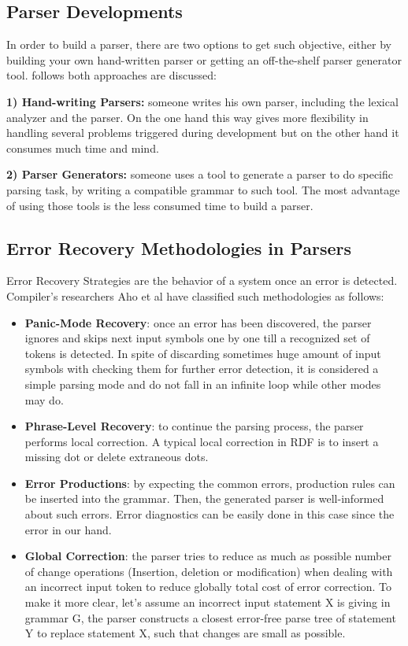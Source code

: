 \subsection{Parser Developments}
In order to build a parser, there are two options to get such objective, either by building your own hand-written parser or getting an off-the-shelf parser generator tool. follows both approaches are discussed:
\par \textbf{1) Hand-writing Parsers:} someone writes his own parser, including the lexical analyzer and the parser. On the one hand this way gives more flexibility in handling several problems triggered during development but on the other hand it consumes much time and mind.
\par \textbf{2) Parser Generators:} someone uses a tool to generate a parser to do specific parsing task, by writing a compatible grammar to such tool. The most advantage of using those tools is the less consumed time to build a parser.  

\subsection{Error Recovery Methodologies in Parsers}
Error Recovery Strategies are the behavior of a system once an error is detected. Compiler's researchers Aho et al \cite{Aho:2006}  have classified such methodologies as follows:
\begin{itemize}
	\item \textbf{Panic-Mode Recovery}: once an error has been discovered, the parser ignores and skips next input symbols one by one till a recognized set of tokens is detected. In spite of discarding sometimes huge amount of input symbols with checking them for further error detection, it is considered a simple parsing mode and do not fall in an infinite loop while other modes may do.
	\item \textbf{Phrase-Level Recovery}: to continue the parsing process, the parser performs local correction. A typical local correction in RDF is to insert a missing dot or delete extraneous dots.
	\item \textbf{Error Productions}: by expecting the common errors, production rules can be inserted into the grammar. Then, the generated parser is well-informed about such errors. Error diagnostics can be easily done in this case since the error in our hand.
	\item \textbf{Global Correction}: the parser tries to reduce as much as possible number of change operations (Insertion, deletion or modification) when dealing with an incorrect input token to reduce globally total cost of error correction. To make it more clear, let's assume an incorrect input statement X is giving in grammar G, the parser constructs a closest error-free parse tree of statement Y to replace statement X, such that changes are small as possible. 
\end{itemize}


